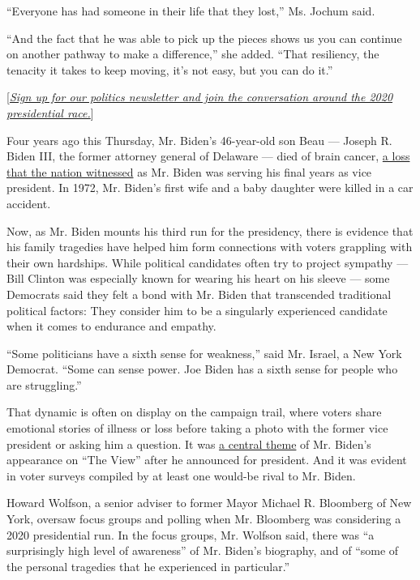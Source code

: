 ``Everyone has had someone in their life that they lost,'' Ms. Jochum
said.

``And the fact that he was able to pick up the pieces shows us you can
continue on another pathway to make a difference,'' she added. ``That
resiliency, the tenacity it takes to keep moving, it's not easy, but you
can do it.''

{[}\href{https://www.nytimes.com/newsletters/politics?smid=rd?action=click\&module=Intentional\&pgtype=Article}{\emph{Sign
up for our politics newsletter and join the conversation around the 2020
presidential race.}}{]}

Four years ago this Thursday, Mr. Biden's 46-year-old son Beau ---
Joseph R. Biden III, the former attorney general of Delaware --- died of
brain cancer,
\href{https://www.nytimes.com/2015/06/01/us/beau-bidens-death-triggers-an-outpouring-of-grief.html}{a
loss that the nation witnessed} as Mr. Biden was serving his final years
as vice president. In 1972, Mr. Biden's first wife and a baby daughter
were killed in a car accident.

Now, as Mr. Biden mounts his third run for the presidency, there is
evidence that his family tragedies have helped him form connections with
voters grappling with their own hardships. While political candidates
often try to project sympathy --- Bill Clinton was especially known for
wearing his heart on his sleeve --- some Democrats said they felt a bond
with Mr. Biden that transcended traditional political factors: They
consider him to be a singularly experienced candidate when it comes to
endurance and empathy.

``Some politicians have a sixth sense for weakness,'' said Mr. Israel, a
New York Democrat. ``Some can sense power. Joe Biden has a sixth sense
for people who are struggling.''

That dynamic is often on display on the campaign trail, where voters
share emotional stories of illness or loss before taking a photo with
the former vice president or asking him a question. It was
\href{https://www.nytimes.com/2019/04/26/us/politics/biden-the-view.html}{a
central theme} of Mr. Biden's appearance on ``The View'' after he
announced for president. And it was evident in voter surveys compiled by
at least one would-be rival to Mr. Biden.

Howard Wolfson, a senior adviser to former Mayor Michael R. Bloomberg of
New York, oversaw focus groups and polling when Mr. Bloomberg was
considering a 2020 presidential run. In the focus groups, Mr. Wolfson
said, there was ``a surprisingly high level of awareness'' of Mr.
Biden's biography, and of ``some of the personal tragedies that he
experienced in particular.''

